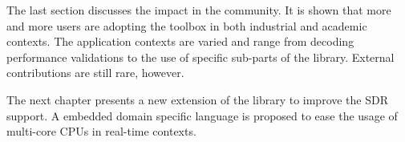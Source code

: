 The last section discusses the \AFFECT impact in the community. It is shown that
more and more users are adopting the toolbox in both industrial and academic
contexts. The application contexts are varied and range from decoding
performance validations to the use of specific sub-parts of the library.
External contributions are still rare, however.

The next chapter presents a new extension of the \AFFECT library to improve the
SDR support. A embedded domain specific language is proposed to ease the usage
of multi-core CPUs in real-time contexts.